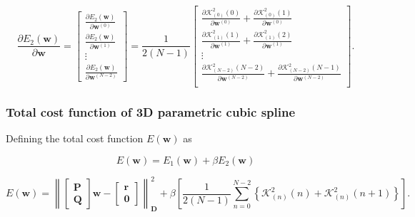 \begin{equation}\label{eq:DE2}
\frac{\partial E_{2}(\mathbf{w})}{\partial \mathbf{w}}
=
\begin{bmatrix}
\frac{\partial E_{2}(\mathbf{w})}{\partial \mathbf{w}^{(0)}}\\[4pt]
\frac{\partial E_{2}(\mathbf{w})}{\partial \mathbf{w}^{(1)}}\\[4pt]
\vdots\\[4pt]
\frac{\partial E_{2}(\mathbf{w})}{\partial \mathbf{w}^{(N-2)}}
\end{bmatrix}
=
\frac{1}{2(N-1)}
\begin{bmatrix}
%
\frac{
\partial 
\mathcal{K}_{(0)}^{2}(0)
}{\partial \mathbf{w}^{(0)}}
+
\frac{
\partial 
\mathcal{K}_{(0)}^{2}(1)
}{\partial \mathbf{w}^{(0)}}\\[4pt]
%
\frac{
\partial 
\mathcal{K}_{(1)}^{2}(1)
}{\partial \mathbf{w}^{(1)}}
+
\frac{
\partial 
\mathcal{K}_{(1)}^{2}(2)
}{\partial \mathbf{w}^{(1)}}\\[4pt]
%
\vdots\\[4pt]
\frac{
\partial 
\mathcal{K}_{(N-2)}^{2}(N-2)
}{\partial \mathbf{w}^{(N-2)}}
+
\frac{
\partial 
\mathcal{K}_{(N-2)}^{2}(N-1)
}{\partial \mathbf{w}^{(N-2)}}\\
%
\end{bmatrix}
.
\end{equation}

\subsubsection{Total cost function of 3D parametric cubic spline}
\label{sec:TotalCostFunc}

Defining the total cost function $E(\mathbf{w})$ as

\begin{equation}
E(\mathbf{w})=E_{1}(\mathbf{w})+\beta E_{2}(\mathbf{w})
\end{equation}

\begin{equation}
E(\mathbf{w})
=
\left\|
\begin{bmatrix}
\mathbf{P}\\
\mathbf{Q}
\end{bmatrix}
\mathbf{w}
-
\begin{bmatrix}
\mathbf{r}\\
\mathbf{0}
\end{bmatrix}
\right\|_{\mathbf{D}}^{2}
+\beta 
\left[
\frac{1}{2(N-1)}
\sum\limits_{n=0}^{N-2}
\left\{
\mathcal{K}_{(n)}^{2}(n)
+
\mathcal{K}_{(n)}^{2}(n+1)
\right\}
\right].
\end{equation}

